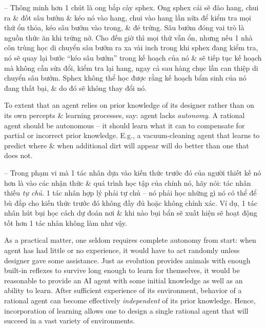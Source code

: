 \documentclass{article}
\begin{document}
\begin{itemize}
\begin{itemize}
\begin{itemize}
\begin{itemize}
				-- Thông minh hơn 1 chút là ong bắp cày sphex. Ong sphex cái sẽ đào hang, chui ra \& đốt sâu bướm \& kéo nó vào hang, chui vào hang lần nữa để kiểm tra mọi thứ ổn thỏa, kéo sâu bướm vào trong, \& đẻ trứng. Sâu bướm đóng vai trò là nguồn thức ăn khi trứng nở. Cho đến giờ thì mọi thứ vẫn ổn, nhưng nếu 1 nhà côn trùng học di chuyển sâu bướm ra xa vài inch trong khi sphex đang kiểm tra, nó sẽ quay lại bước ``kéo sâu bướm'' trong kế hoạch của nó \& sẽ tiếp tục kế hoạch mà không cần sửa đổi, kiểm tra lại hang, ngay cả sau hàng chục lần can thiệp di chuyển sâu bướm. Sphex không thể học được rằng kế hoạch bẩm sinh của nó đang thất bại, \& do đó sẽ không thay đổi nó.

				To extent that an agent relies on prior knowledge of its designer rather than on its own percepts \& learning processes, say: agent lacks {\it autonomy}. A rational agent should be autonomous -- it should learn what it can to compensate for partial or incorrect prior knowledge. E.g., a vacuum-cleaning agent that learns to predict where \& when additional dirt will appear will do better than one that does not.

				-- Trong phạm vi mà 1 tác nhân dựa vào kiến thức trước đó của người thiết kế nó hơn là vào các nhận thức \& quá trình học tập của chính nó, hãy nói: tác nhân thiếu {\it tự chủ}. 1 tác nhân hợp lý phải tự chủ -- nó phải học những gì nó có thể để bù đắp cho kiến thức trước đó không đầy đủ hoặc không chính xác. Ví dụ, 1 tác nhân hút bụi học cách dự đoán nơi \& khi nào bụi bẩn sẽ xuất hiện sẽ hoạt động tốt hơn 1 tác nhân không làm như vậy.

				As a practical matter, one seldom requires complete autonomy from start: when agent has had little or no experience, it would have to act randomly unless designer gave some assistance. Just as evolution provides animals with enough built-in reflexes to survive long enough to learn for themselves, it would be reasonable to provide an AI agent with some initial knowledge as well as an ability to learn. After sufficient experience of its environment, behavior of a rational agent can become effectively {\it independent} of its prior knowledge. Hence, incorporation of learning allows one to design a single rational agent that will succeed in a vast variety of environments.


\end{itemize}
\end{itemize}
\end{itemize}
\end{itemize}
\end{document}
